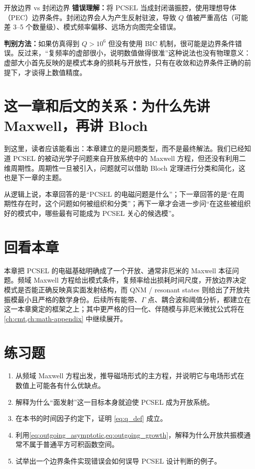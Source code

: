 \begin{CommonPitfallBox}{开放边界 vs 封闭边界}
\textbf{错误理解：}将 PCSEL 当成封闭谐振腔，使用理想导体（PEC）边界条件。封闭边界会人为产生反射驻波，导致 $Q$ 值被严重高估（可能差 3--5 个数量级）、模式频率偏移、远场方向图完全错误。

\textbf{判别方法：}如果仿真得到 $Q>10^6$ 但没有使用 BIC 机制，很可能是边界条件错误。反过来，“复频率的虚部很小，说明数值做得很准”这种说法也没有物理意义：虚部大小首先反映的是模式本身的损耗与开放性，只有在收敛和边界条件正确的前提下，才谈得上数值精度。
\end{CommonPitfallBox}
\section{这一章和后文的关系：为什么先讲 Maxwell，再讲 Bloch}
到这里，读者应该能看出：本章建立的是问题类型，而不是最终解法。我们已经知道 PCSEL 的被动光学子问题来自开放系统中的 Maxwell 方程，但还没有利用二维周期性。周期性一旦被引入，问题就可以借助 Bloch 定理进行分类和简化，这也是下一章的主题。

从逻辑上说，本章回答的是“PCSEL 的电磁问题是什么”；下一章回答的是“在周期性存在时，这个问题如何被组织和分类”；再下一章才会进一步问“在这些被组织好的模式中，哪些最有可能成为 PCSEL 关心的候选模”。

\section*{回看本章}
本章把 PCSEL 的电磁基础明确成了一个开放、通常非厄米的 Maxwell 本征问题。频域 Maxwell 方程给出模式条件，复频率给出损耗时间尺度，开放边界决定模式是否能正确反映真实面发射结构，而 QNM / resonant states 则给出了开放共振模最小且严格的数学身份。后续所有能带、$\Gamma$ 点、耦合波和阈值分析，都建立在这一本章奠定的框架之上；其中更严格的归一化、伴随模与非厄米微扰公式将在 \cref{ch:cmt,ch:math-appendix} 中继续展开。

\section*{练习题}
\begin{enumerate}
  \item \basicq 从频域 Maxwell 方程出发，推导磁场形式的主方程，并说明它与电场形式在数值上可能各有什么优缺点。

  \item \basicq 解释为什么“面发射”这一目标本身就迫使 PCSEL 成为开放系统。

  \item \midq 在本书的时间因子约定下，证明 \cref{eq:q_def} 成立。

  \item \midq 利用\cref{eq:outgoing_asymptotic,eq:outgoing_growth}，解释为什么开放共振模通常不属于普通平方可积函数空间。

  \item \hardq 试举出一个边界条件实现错误会如何误导 PCSEL 设计判断的例子。
\end{enumerate}

